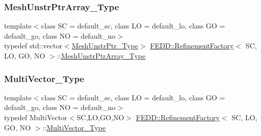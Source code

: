 \mbox{\label{classFEDD_1_1RefinementFactory_a772a738296d703be721b9b1c877f1a9e}} 
\subsubsection{\texorpdfstring{Mesh\+Unstr\+Ptr\+Array\+\_\+\+Type}{MeshUnstrPtrArray\_Type}}
{\footnotesize\ttfamily template$<$class SC = default\+\_\+sc, class LO = default\+\_\+lo, class GO = default\+\_\+go, class NO = default\+\_\+no$>$ \\
typedef std\+::vector$<$\hyperlink{classFEDD_1_1RefinementFactory_a1a278d01c278972af01f2996247af8ac}{Mesh\+Unstr\+Ptr\+\_\+\+Type}$>$ \hyperlink{classFEDD_1_1RefinementFactory}{F\+E\+D\+D\+::\+Refinement\+Factory}$<$ SC, LO, GO, NO $>$\+::\hyperlink{classFEDD_1_1RefinementFactory_a772a738296d703be721b9b1c877f1a9e}{Mesh\+Unstr\+Ptr\+Array\+\_\+\+Type}}

\mbox{\label{classFEDD_1_1RefinementFactory_af7c4cb285d95e61820d63b9344a90976}} 
\subsubsection{\texorpdfstring{Multi\+Vector\+\_\+\+Type}{MultiVector\_Type}}
{\footnotesize\ttfamily template$<$class SC = default\+\_\+sc, class LO = default\+\_\+lo, class GO = default\+\_\+go, class NO = default\+\_\+no$>$ \\
typedef Multi\+Vector$<$SC,LO,GO,NO$>$ \hyperlink{classFEDD_1_1RefinementFactory}{F\+E\+D\+D\+::\+Refinement\+Factory}$<$ SC, LO, GO, NO $>$\+::\hyperlink{classFEDD_1_1RefinementFactory_af7c4cb285d95e61820d63b9344a90976}{Multi\+Vector\+\_\+\+Type}}

\mbox{\label{classFEDD_1_1RefinementFactory_a433fd79c1903a3771cffbaed6f5dbd71}} 
